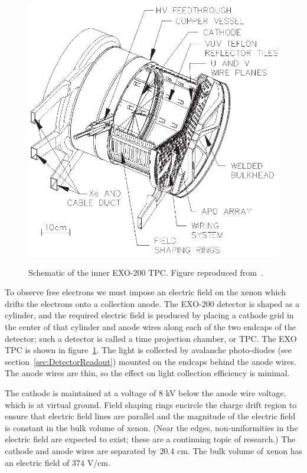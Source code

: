 \begin{figure}
\begin{center}
\includegraphics[keepaspectratio=true,width=\textwidth]{TPCSchematic.eps}
\end{center}
\renewcommand{\baselinestretch}{1}
\small\normalsize
\begin{quote}
\caption{Schematic of the inner EXO-200 TPC.  Figure reproduced from~\cite{detectorPartI}.}
\label{fig:TPCSchematic}
\end{quote}
\end{figure}
\renewcommand{\baselinestretch}{2}
\small\normalsize

To observe free electrons we must impose an electric field on the xenon which drifts the electrons onto a collection anode.  The EXO-200 detector is shaped as a cylinder, and the required electric field is produced by placing a cathode grid in the center of that cylinder and anode wires along each of the two endcaps of the detector; such a detector is called a time projection chamber, or TPC.  The EXO TPC is shown in figure~\ref{fig:TPCSchematic}.  The light is collected by avalanche photo-diodes (see section~\ref{sec:DetectorReadout}) mounted on the endcaps behind the anode wires. The anode wires are thin, so the effect on light collection efficiency is minimal.

The cathode is maintained at a voltage of $8$ kV below the anode wire voltage, which is at virtual ground.  Field shaping rings encircle the charge drift region to ensure that electric field lines are parallel and the magnitude of the electric field is constant in the bulk volume of xenon.  (Near the edges, non-uniformities in the electric field are expected to exist; these are a continuing topic of research.)  The cathode and anode wires are separated by $20.4$ cm. The bulk volume of xenon has an electric field of $374$ V/cm.

